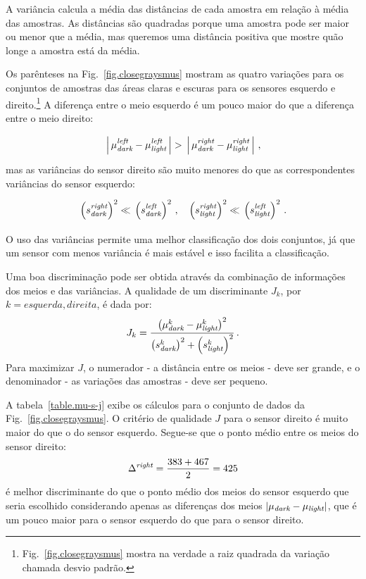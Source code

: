 A variância calcula a média das distâncias de cada amostra em relação à média das amostras. As distâncias são quadradas porque uma amostra pode ser maior ou menor que a média, mas queremos uma distância positiva que mostre quão longe a amostra está da média.

Os parênteses na Fig.~\ref{fig.closegraysmus} mostram as quatro variações para os conjuntos de amostras das áreas claras e escuras para os sensores esquerdo e direito.\footnote{Fig.~\ref{fig.closegraysmus} mostra na verdade a raiz quadrada da variação chamada desvio padrão.} A diferença entre o meio esquerdo é um pouco maior do que a diferença entre o meio direito:
\[
\rule[-2ex]{0pt}{6ex}\left|\,\mu_{\sub{dark}}^{\sub{left}}-\mu_{\sub{light}}^{\sub{left}}\,\right| > \rule[-2ex]{0pt}{6ex}\left|\,\mu_{\sub{dark}}^{\sub{right}}-\mu_{\sub{light}}^{\sub{right}}\,\right|\,,
\]
mas as variâncias do sensor direito são muito menores do que as correspondentes variâncias do sensor esquerdo:
\[
\rule[-2ex]{0pt}{6ex}\left(s_{\sub{dark}}^{\sub{right}}\right)^2
\ll
\rule[-3ex]{0pt}{6ex}\left(s_{\sub{dark}}^{\sub{left}}\right)^2\,,\;\;\;
\rule[-2ex]{0pt}{6ex}\left(s_{\sub{light}}^{\sub{right}}\right)^2
\ll
\rule[-3ex]{0pt}{6ex}\left(s_{\sub{light}}^{\sub{left}}\right)^2\,.
\]
O uso das variâncias permite uma melhor classificação dos dois conjuntos, já que um sensor com menos variância é mais estável e isso facilita a classificação.

Uma boa discriminação pode ser obtida através da combinação de informações dos meios e das variâncias. A qualidade de um discriminante $J_k$, por $k=\mathit{esquerda},\mathit{direita}$, é dada por:
\begin{equation}
J_k = \frac{\left(\mu_{\textit{\scriptsize dark}}^k - \mu_{\textit{\scriptsize light}}^k\right)^2}{\left(s_{\textit{\scriptsize dark}}^k\right)^2 + \left(s_{\textit{\scriptsize light}}^k\right)^2}\,.\label{eq.j}
\end{equation}
Para maximizar $J$, o numerador - a distância entre os meios - deve ser grande, e o denominador - as variações das amostras - deve ser pequeno.

A tabela~\ref{table.mu-s-j} exibe os cálculos para o conjunto de dados da Fig.~\ref{fig.closegraysmus}. O critério de qualidade $J$ para o sensor direito é muito maior do que o do sensor esquerdo. Segue-se que o ponto médio entre os meios do sensor direito:
\[
\Delta^{\textit{\scriptsize right}}=\frac{383+467}{2}=425
\]
é melhor discriminante do que o ponto médio dos meios do sensor esquerdo que seria escolhido considerando apenas as diferenças dos meios $|\mu_{\textit{\scriptsize dark}}-\mu_{\textit{\scriptsize light}}|$, que é um pouco maior para o sensor esquerdo do que para o sensor direito.

